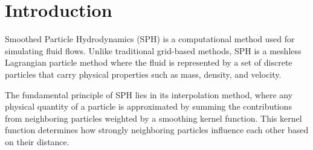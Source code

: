 
\section*{Introduction}

Smoothed Particle Hydrodynamics (SPH) is a computational method used for simulating fluid flows. Unlike traditional grid-based methods, SPH is a meshless Lagrangian particle method where the fluid is represented by a set of discrete particles that carry physical properties such as mass, density, and velocity.

The fundamental principle of SPH lies in its interpolation method, where any physical quantity of a particle is approximated by summing the contributions from neighboring particles weighted by a smoothing kernel function. This kernel function determines how strongly neighboring particles influence each other based on their distance.

